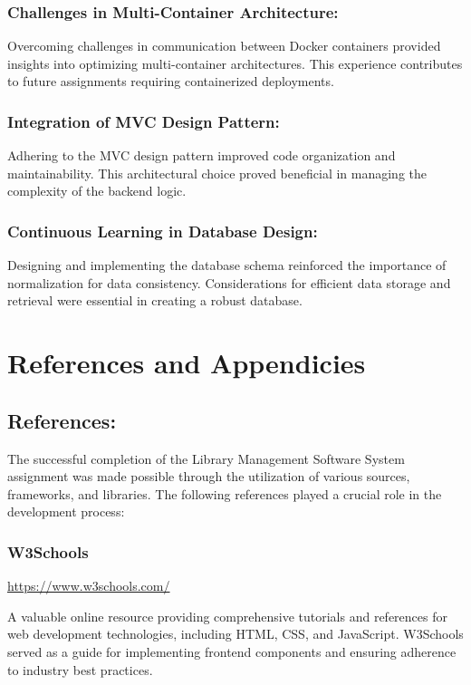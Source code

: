 \documentclass[12pt,titlepage,a4paper]{report}
\begin{document}
\subsection{Challenges in Multi-Container Architecture:}
\noindent
Overcoming challenges in communication between Docker containers provided insights into optimizing multi-container architectures. This experience contributes to future assignments requiring containerized deployments.

\subsection{Integration of MVC Design Pattern:}
\noindent
Adhering to the MVC design pattern improved code organization and maintainability. This architectural choice proved beneficial in managing the complexity of the backend logic.

\subsection{Continuous Learning in Database Design:}
\noindent
Designing and implementing the database schema reinforced the importance of normalization for data consistency. Considerations for efficient data storage and retrieval were essential in creating a robust database.

\chapter{References and Appendicies}

\section{References:}
The successful completion of the Library Management Software System assignment was made possible through the utilization of various sources, frameworks, and libraries. The following references played a crucial role in the development process:


\subsection{W3Schools} 
\noindent \url{https://www.w3schools.com/}

A valuable online resource providing comprehensive tutorials and references for web development technologies, including HTML, CSS, and JavaScript. W3Schools served as a guide for implementing frontend components and ensuring adherence to industry best practices.
\end{document}
